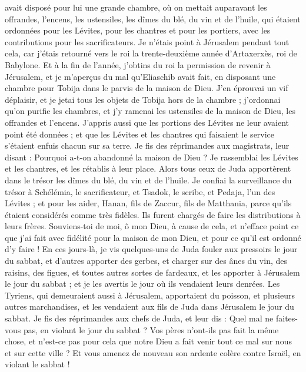 \begin{multicols}{2}
avait disposé pour lui une grande chambre, où on mettait auparavant les offrandes, l'encens, les ustensiles, les dîmes du blé, du vin et de l'huile, qui étaient ordonnées pour les Lévites, pour les chantres et pour les portiers, avec les contributions pour les sacrificateurs.
Je n'étais point à Jérusalem pendant tout cela, car j’étais retourné vers le roi la trente-deuxième année d'Artaxerxès, roi de Babylone. Et à la fin de l’année, j'obtins du roi la permission
de revenir à Jérusalem, et je m'aperçus du mal qu'Eliaschib avait fait, en disposant une chambre pour Tobija dans le parvis de la maison de Dieu.
J'en éprouvai un vif déplaisir, et je jetai tous les objets de Tobija hors de la chambre ;
j’ordonnai qu’on purifie les chambres, et j'y ramenai les ustensiles de la maison de Dieu, les offrandes et l'encens.
J'appris aussi que les portions des Lévites ne leur avaient point été données ; et que les Lévites et les chantres qui faisaient le service s'étaient enfuis chacun sur sa terre.
Je fis des réprimandes aux magistrats, leur disant : Pourquoi a-t-on abandonné la maison de Dieu ? Je rassemblai les Lévites et les chantres, et les rétablis à leur place.
Alors tous ceux de Juda apportèrent dans le trésor les dîmes du blé, du vin et de l'huile.
Je confiai la surveillance du trésor à Schélémia,  le sacrificateur, et Tsadok, le scribe, et Pedaja, l’un des Lévites ; et pour les aider, Hanan, fils de Zaccur, fils de Matthania, parce qu'ils étaient considérés comme très fidèles. Ils furent chargés de faire les distributions à leurs frères.
Souviens-toi de moi, ô mon Dieu, à cause de cela, et n'efface point ce que j'ai fait avec fidélité pour la maison de mon Dieu, et pour ce qu'il est ordonné d'y faire !
En ces jours-là, je vis quelques-uns de Juda fouler aux pressoirs le jour du sabbat, et d'autres apporter des gerbes, et charger sur des ânes du vin, des raisins, des figues, et toutes autres sortes de fardeaux, et les apporter à Jérusalem le jour du sabbat ; et je les avertis le jour où ils vendaient leurs denrées.
Les Tyriens, qui demeuraient aussi à Jérusalem, apportaient du poisson, et plusieurs autres marchandises, et les vendaient aux fils de Juda dans Jérusalem le jour du sabbat.
Je fis des réprimandes aux chefs de Juda, et leur dis : Quel mal ne faites-vous pas, en violant le jour du sabbat ?
Vos pères n'ont-ils pas fait la même chose, et n'est-ce pas pour cela que notre Dieu a fait venir tout ce mal sur nous et sur cette ville ? Et vous amenez de nouveau son ardente colère contre Israël, en violant le sabbat !

\end{multicols}
